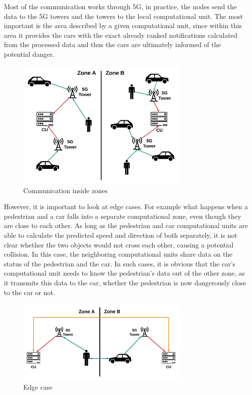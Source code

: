 \documentclass[conference]{IEEEtran}
\begin{document}
Most of the communication works through 5G, in practice, the nodes send the data to the 5G towers and the towers to the local computational unit. The most important is the area described by a given computational unit, since within this area it provides the cars with the exact already ranked notifications calculated from the processed data and thus the cars are ultimately informed of the potential danger.

\begin{figure}[h]
    \centering
    \includegraphics[width=8.5cm]{./pics/Communication.png}
    \caption{Communication inside zones}
\end{figure}

However, it is important to look at edge cases. For example what happens when a pedestrian and a car falls into a separate computational zone, even though they are close to each other. As long as the pedestrian and car computational units are able to calculate the predicted speed and direction of both separately, it is not clear whether the two objects would not cross each other, causing a potential collision. In this case, the neighboring computational units share data on the status of the pedestrian and the car. In such cases, it is obvious that the car’s computational unit needs to know the pedestrian’s data out of the other zone, as it transmits this data to the car, whether the pedestrian is now dangerously close to the car or not.

\begin{figure}[h]
    \centering
    \includegraphics[width=8.5cm]{./pics/Edge case.png}
    \caption{Edge case}
\end{figure}
\end{document}

